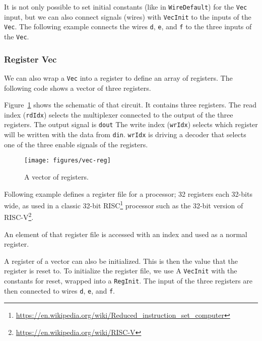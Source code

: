\documentclass[%
    10pt,
    headinclude, footexclude,
    openright, %
    notitlepage,
    cleardoubleempty,
    headsepline,
    pointlessnumbers,
    bibtotoc, idxtotoc,
    ]{scrbook}
\newcommand{\scale}{0.7}
\newcommand{\code}[1]{{\lstinline[basicstyle=\small\ttfamily]{#1}}}
\newcommand{\myref}[2]{\href{#1}{#2}}
\renewcommand{\myref}[2]{{#2}{\footnote{\url{#1}}}}
\begin{document}

It is not only possible to set initial constants (like in \code{WireDefault}) for the \code{Vec} input,
but we can also connect signals (wires) with \code{VecInit} to the inputs of the \code{Vec}.
The following example connects the wires \code{d}, \code{e}, and \code{f} to the three
inputs of the \code{Vec}.



\subsubsection{Register Vec}

We can also wrap a \code{Vec} into a register to define an array of registers.
The following code shows a vector of three registers.

Figure~\ref{fig:vec-reg} shows the schematic of that circuit. It contains three registers.
The read index (\code{rdIdx}) selects the multiplexer connected to the output of the three
registers. The output signal is \code{dout}
The write index (\code{wrIdx}) selects which register will be written with the data
from \code{din}. \code{wrIdx} is driving a decoder that selects one of the three
enable signals of the registers.

\begin{figure}[t]
  \centering
  \texttt{[image: figures/vec-reg]}
  \caption{A vector of registers.}
  \label{fig:vec-reg}
\end{figure}


Following example defines a register file for a processor; 32 registers
each 32-bits wide, as used in a classic 32-bit
\myref{https://en.wikipedia.org/wiki/Reduced_instruction_set_computer}{RISC}
processor such as the 32-bit version of \myref{https://en.wikipedia.org/wiki/RISC-V}{RISC-V}.


\noindent An element of that register file is accessed with an index and used as a normal register.


A register of a vector can also be initialized. This is then the value that the register is reset to.
To initialize the register file, we use A \code{VecInit} with the constants for reset, wrapped
into a \code{RegInit}. The input of the three registers are then connected to wires \code{d},
\code{e}, and \code{f}.
\end{document}
